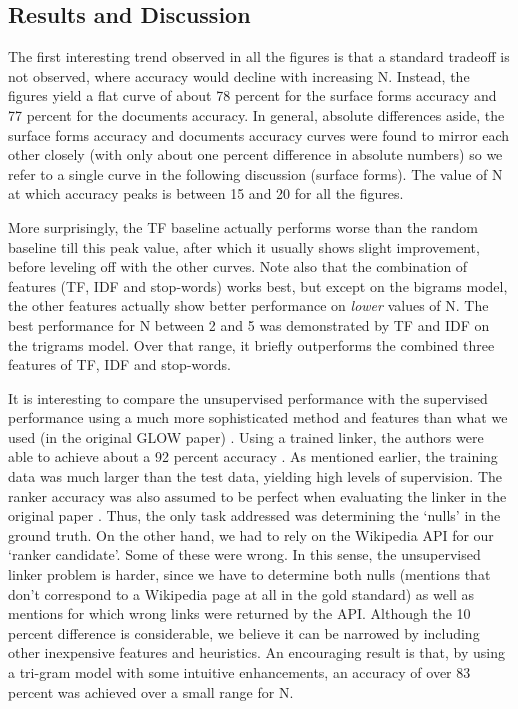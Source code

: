 \documentclass[runningheads,a4paper]{llncs}
\begin{document}
\subsection{Results and Discussion}
The first interesting trend observed in all the figures is that a standard tradeoff is not observed, where accuracy would decline with increasing N. Instead, the figures yield a flat curve of about 78 percent for the surface forms accuracy and 77 percent for the documents accuracy. In general, absolute differences aside, the surface forms accuracy and documents accuracy curves were found to mirror each other closely (with only about one percent difference in absolute numbers) so we refer to a single curve in the following discussion (surface forms). The value of N at which accuracy peaks is between 15 and 20 for all the figures. 

More surprisingly, the TF baseline actually performs worse than the random baseline till this peak value, after which it usually shows slight improvement, before leveling off with the other curves. Note also that the combination of features (TF, IDF and stop-words) works best, but except on the bigrams model, the other features actually show better performance on \emph{lower} values of N. The best performance for N between 2 and 5 was demonstrated by TF and IDF on the trigrams model. Over that range, it briefly outperforms the combined three features of TF, IDF and stop-words.

It is interesting to compare the unsupervised performance with the supervised performance using a much more sophisticated method and features than what we used (in the original GLOW paper) \cite{roth}. Using a trained linker, the authors were able to achieve about a 92 percent accuracy . As mentioned earlier, the training data was much larger than the test data, yielding high levels of supervision. The ranker accuracy was also assumed to be perfect when evaluating the linker in the original paper \cite{roth}. Thus, the only task addressed was determining the `nulls' in the ground truth. On the other hand, we had to rely on the Wikipedia API for our `ranker candidate'. Some of these were wrong. In this sense, the unsupervised linker problem is harder, since we have to determine both nulls (mentions that don't correspond to a Wikipedia page at all in the gold standard) as well as mentions for which wrong links were returned by the API. Although the 10 percent difference is considerable, we believe it can be narrowed by including other inexpensive features and heuristics.  An encouraging result is that, by using a tri-gram model with some intuitive enhancements, an accuracy of over 83 percent was achieved over a small range for N. 
\end{document}
